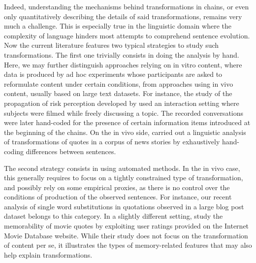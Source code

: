 \documentclass[a4paper,fleqn]{cas-dc}
\begin{document}
Indeed, understanding the mechanisms behind transformations in chains, or even only quantitatively describing the details of said transformations, remains very much a challenge.  This is especially true in the linguistic domain where the complexity of language hinders most attempts to comprehend sentence evolution. Now the current literature features two typical strategies to study such transformations. The first one trivially consists in doing the analysis by hand.  Here, we may further distinguish approaches relying on in vitro content, where data is produced by ad hoc experiments whose participants are asked to reformulate content under certain conditions, from approaches using in vivo content, usually based on large text datasets.
For instance, the study of the propagation of risk perception developed by \citet{moussaid_amplification_2015} used an interaction setting where subjects were filmed while freely discussing a topic. The recorded conversations were later hand-coded for the presence of certain information items introduced at the beginning of the chains. On the in vivo side, \citet{lauf_analyzing_2013} carried out a linguistic analysis of transformations of quotes in a corpus of news stories by exhaustively hand-coding differences between sentences.

The second strategy consists in using automated methods.  In the in vivo case, this generally requires to focus on a tightly constrained type of transformation, and possibly rely on some empirical proxies, as there is no control over the conditions of production of the observed sentences. %
For instance, our recent analysis of single word substitutions in quotations observed in a large blog post dataset \citep{lerique-2018-semantic-drift} belongs to this category.
In a slightly different setting, \citet{danescu-niculescu-mizil_you_2012} study the memorability of movie quotes by exploiting user ratings provided on the Internet Movie Database website. While their study does not focus on the transformation of content per se, it illustrates the types of memory-related features that may also help explain transformations.
\end{document}
